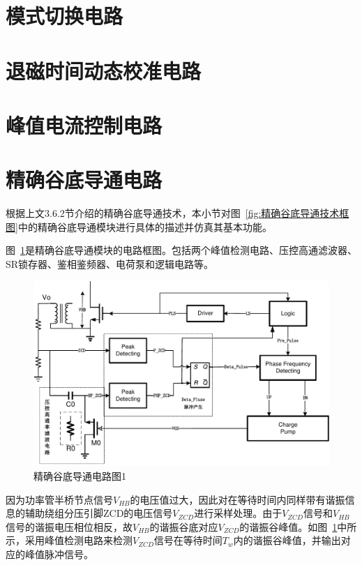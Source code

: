 \section{模式切换电路}

\section{退磁时间动态校准电路}

\section{峰值电流控制电路}


\section{精确谷底导通电路}

根据上文3.6.2节介绍的精确谷底导通技术，本小节对图~\ref{fig:精确谷底导通技术框图}中的精确谷底导通模块进行具体的描述并仿真其基本功能。

图~\ref{fig:精确谷底导通电路图1}是精确谷底导通模块的电路框图。包括两个峰值检测电路、压控高通滤波器、SR锁存器、鉴相鉴频器、电荷泵和逻辑电路等。

\begin{figure}[htbp] 
    \centering
    \includegraphics[width=0.8\linewidth]{figures/精确谷底导通电路图1.pdf}
    \caption{精确谷底导通电路图1}
    \label{fig:精确谷底导通电路图1}
\end{figure}


因为功率管半桥节点信号$V_{HB}$的电压值过大，因此对在等待时间内同样带有谐振信息的辅助绕组分压引脚ZCD的电压信号$V_{ZCD}$进行采样处理。由于$V_{ZCD}$信号和$V_{HB}$信号的谐振电压相位相反，故$V_{HB}$的谐振谷底对应$V_{ZCD}$的谐振谷峰值。如图~\ref{fig:精确谷底导通电路图1}中所示，采用峰值检测电路来检测$V_{ZCD}$信号在等待时间$T_w$内的谐振谷峰值，并输出对应的峰值脉冲信号。


